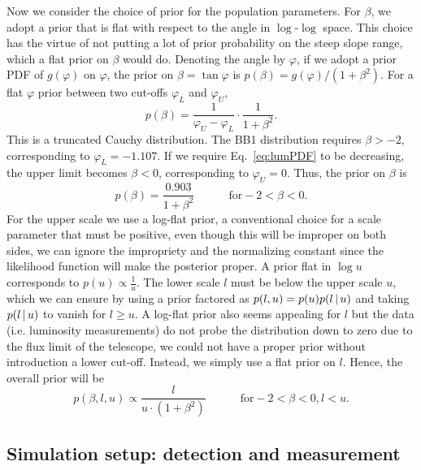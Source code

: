 Now we consider the choice of prior for the population parameters.
For $\beta$, we adopt a prior that is flat with respect to the angle in $\log$-$\log$ space.
This choice has the virtue of not putting a lot of prior probability on the steep slope range, which a flat prior on $\beta$ would do.
Denoting the angle by $\varphi$, if we adopt a prior PDF of $g(\varphi)$ on $\varphi$, the prior on $\beta = \tan\varphi$ is $p(\beta) = g(\varphi)/(1 + \beta^2)$.
For a flat $\varphi$ prior between two cut-offs $\varphi_L$ and $\varphi_U$,
\begin{equation}
	p(\beta) = \frac{1}{\varphi_U - \varphi_L} \cdot \frac{1}{1 + \beta^2}.
\end{equation}
This is a truncated Cauchy distribution.
The BB1 distribution requires $\beta > -2$, corresponding to $\varphi_L = -1.107$.
If we require Eq.~\ref{eq:lumPDF} to be decreasing, the upper limit becomes $\beta < 0$, corresponding to $\varphi_U = 0$.
Thus, the prior on $\beta$ is
\begin{equation}
p(\beta) = \frac{0.903}{1 + \beta^2} \quad \quad \quad \textrm{for} -2 < \beta < 0.
\end{equation}
For the upper scale we use a log-flat prior, a conventional choice for a scale parameter that must be positive, even though this will be improper on both sides, we can ignore the impropriety and the normalizing constant since the likelihood function will make the posterior proper.
A prior flat in $\log{u}$ corresponds to $p(u) \propto \frac{1}{u}$.
The lower scale $l$ must be below the upper scale $u$, which we can ensure by using a prior factored as $p(l, u) = p(u) p(l \,|\, u)$ and taking $p(l \,|\, u)$ to vanish for $l \geq u$.
A log-flat prior also seems appealing for $l$ but the data (i.e. luminosity measurements) do not probe the distribution down to zero due to the flux limit of the telescope, we could not have a proper prior without introduction a lower cut-off.
Instead, we simply use a flat prior on $l$.
Hence, the overall prior will be \begin{equation}\label{eq:popParsPriorPDF} p(\beta, l, u) \propto \frac{l}{u \cdot (1 + \beta^2)} \quad\quad\quad \textrm{for} -2 < \beta < 0, l < u.
\end{equation}

\subsection{Simulation setup: detection and measurement}
\label{sec:simsetup-data}


